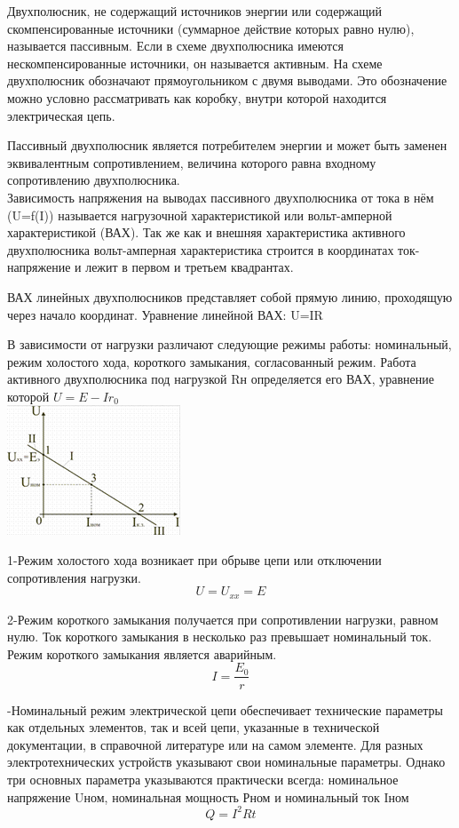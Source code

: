 \documentclass[a4paper, 12pt]{article}
\begin{document}
Двухполюсник, не содержащий источников энергии или содержащий скомпенсированные источники (суммарное действие которых равно нулю), называется пассивным. Если в схеме двухполюсника имеются нескомпенсированные источники, он называется активным. На схеме двухполюсник обозначают прямоугольником с двумя выводами. Это обозначение можно условно рассматривать как коробку, внутри которой находится электрическая цепь. 

Пассивный двухполюсник является потребителем энергии и может быть заменен эквивалентным сопротивлением, величина которого равна входному сопротивлению двухполюсника.\\

Зависимость напряжения на выводах пассивного двухполюсника от тока в нём (U=f(I)) называется нагрузочной характеристикой или вольт-амперной характеристикой (ВАХ). Так же как и внешняя характеристика активного двухполюсника вольт-амперная характеристика строится в координатах ток-напряжение и лежит в первом и третьем квадрантах.

ВАХ линейных двухполюсников представляет собой прямую линию, проходящую через начало координат. Уравнение линейной ВАХ: U=IR

В зависимости от нагрузки различают следующие режимы работы: номинальный, режим холостого хода, короткого замыкания, согласованный режим. Работа активного двухполюсника под нагрузкой Rн определяется его ВАХ, уравнение которой $ U = E - Ir_0 $ \\
\includegraphics{11-1.png}

1-Режим холостого хода возникает при обрыве цепи или отключении сопротивления нагрузки.
\[
       U = U_{xx} = E
\]

2-Режим короткого замыкания получается при сопротивлении нагрузки, равном нулю. Ток короткого замыкания в несколько раз превышает номинальный ток. Режим короткого замыкания является аварийным.
\[
       I = \frac{E_0}{r} 
\]

-Номинальный режим электрической цепи обеспечивает технические параметры как отдельных элементов, так и всей цепи, указанные в технической документации, в справочной литературе или на самом элементе. Для разных электротехнических устройств указывают свои номинальные параметры. Однако три основных параметра указываются практически всегда: номинальное напряжение Uном, номинальная мощность Рном и номинальный ток Iном
\[
       Q = I^2 Rt
\]
\end{document}
